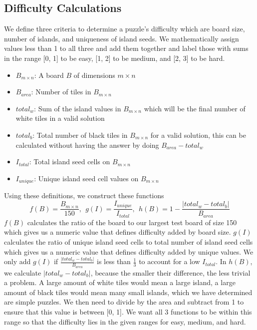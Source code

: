 \documentclass{article}
\theoremstyle{definition}
\begin{document}
\subsection{Difficulty Calculations}
We define three criteria to determine a puzzle's difficulty which are board size, number of islands, and uniqueness of island seeds. We mathematically assign values less than 1 to all three and add them together and label those with sums in the range [0, 1] to be easy, [1, 2] to be medium, and [2, 3] to be hard. 
\begin{itemize}
\itemsep0em 
    \item $B_{m \times n}$: A board $B$ of dimensions $m\times n$ 
    \item $B_{area}$: Number of tiles in $B_{m \times n}$
    \item $total_w$: Sum of the island values in $B_{m\times n}$ which will be the final number of white tiles in a valid solution
    \item $total_b$: Total number of black tiles in $B_{m\times n}$ for a valid solution, this can be calculated without having the answer by doing $B_{area} - total_w$
    \item $I_{total}$: Total island seed cells on $B_{m \times n}$
    \item $I_{unique}$: Unique island seed cell values on $B_{m \times n}$
\end{itemize}
Using these definitions, we construct these functions
\begin{equation}
    f(B) = \frac{B_{m \times n}}{150} ,~~
    g(I) = \frac{I_{unique}}{I_{total}}  ,~~
    h(B) = 1 - \frac{|total_w - total_b|}{B_{area}}
\end{equation}
$f(B)$ calculates the ratio of the board to our largest test board of size 150 which gives us a numeric value that defines difficulty added by board size. $g(I)$ calculates the ratio of unique island seed cells to total number of island seed cells which gives us a numeric value that defines difficulty added by unique values. We only add $g(I)$ if $\frac{|total_w - total_b|}{B_{area}}$ is less than $\frac{1}{3}$ to account for a low $I_{total}$. In $h(B)$, we calculate $|total_w - total_b|$, because the smaller their difference, the less trivial a problem. A large amount of white tiles would mean a large island, a large amount of black tiles would mean many small islands, which we have determined are simple puzzles. We then need to divide by the area and subtract from 1 to ensure that this value is between [0, 1]. We want all 3 functions to be within this range so that the difficulty lies in the given ranges for easy, medium, and hard.
\end{document}
